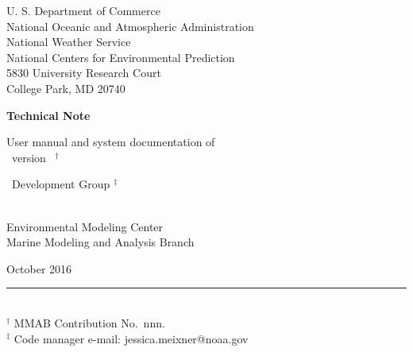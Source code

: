 
\pagestyle{empty}

\begin{center} 
U. S. Department of Commerce \\
National Oceanic and Atmospheric Administration \\
National Weather Service \\
National Centers for Environmental Prediction \\
5830 University Research Court \\
College Park, MD 20740


\vspace{15mm}

{\bf Technical Note}

\vspace{15mm}

{\large User manual and system documentation of \\
\ww\ version \WWver\ $^\dag$} \\

\vspace{15mm}

\ww\ Development Group $^\ddag$ \\
\strut \\
Environmental Modeling Center \\
Marine Modeling and Analysis Branch

\vfill

 October 2016 \\


\vfill

\end{center}
\noindent \rule{140mm}{0.5mm} \\
{\small $^\dag$ MMAB Contribution No.~nnn. \\
$^\ddag$ Code manager e-mail: jessica.meixner@noaa.gov}

